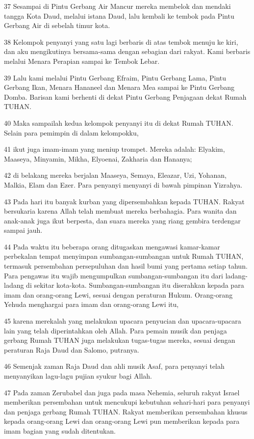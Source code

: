 \par 37 Sesampai di Pintu Gerbang Air Mancur mereka membelok dan mendaki tangga Kota Daud, melalui istana Daud, lalu kembali ke tembok pada Pintu Gerbang Air di sebelah timur kota.
\par 38 Kelompok penyanyi yang satu lagi berbaris di atas tembok menuju ke kiri, dan aku mengikutinya bersama-sama dengan sebagian dari rakyat. Kami berbaris melalui Menara Perapian sampai ke Tembok Lebar.
\par 39 Lalu kami melalui Pintu Gerbang Efraim, Pintu Gerbang Lama, Pintu Gerbang Ikan, Menara Hananeel dan Menara Mea sampai ke Pintu Gerbang Domba. Barisan kami berhenti di dekat Pintu Gerbang Penjagaan dekat Rumah TUHAN.
\par 40 Maka sampailah kedua kelompok penyanyi itu di dekat Rumah TUHAN. Selain para pemimpin di dalam kelompokku,
\par 41 ikut juga imam-imam yang meniup trompet. Mereka adalah: Elyakim, Maaseya, Minyamin, Mikha, Elyoenai, Zakharia dan Hananya;
\par 42 di belakang mereka berjalan Maaseya, Semaya, Eleazar, Uzi, Yohanan, Malkia, Elam dan Ezer. Para penyanyi menyanyi di bawah pimpinan Yizrahya.
\par 43 Pada hari itu banyak kurban yang dipersembahkan kepada TUHAN. Rakyat bersukaria karena Allah telah membuat mereka berbahagia. Para wanita dan anak-anak juga ikut berpesta, dan suara mereka yang riang gembira terdengar sampai jauh.
\par 44 Pada waktu itu beberapa orang ditugaskan mengawasi kamar-kamar perbekalan tempat menyimpan sumbangan-sumbangan untuk Rumah TUHAN, termasuk persembahan persepuluhan dan hasil bumi yang pertama setiap tahun. Para pengawas itu wajib mengumpulkan sumbangan-sumbangan itu dari ladang-ladang di sekitar kota-kota. Sumbangan-sumbangan itu diserahkan kepada para imam dan orang-orang Lewi, sesuai dengan peraturan Hukum. Orang-orang Yehuda menghargai para imam dan orang-orang Lewi itu,
\par 45 karena merekalah yang melakukan upacara penyucian dan upacara-upacara lain yang telah diperintahkan oleh Allah. Para pemain musik dan penjaga gerbang Rumah TUHAN juga melakukan tugas-tugas mereka, sesuai dengan peraturan Raja Daud dan Salomo, putranya.
\par 46 Semenjak zaman Raja Daud dan ahli musik Asaf, para penyanyi telah menyanyikan lagu-lagu pujian syukur bagi Allah.
\par 47 Pada zaman Zerubabel dan juga pada masa Nehemia, seluruh rakyat Israel memberikan persembahan untuk mencukupi kebutuhan sehari-hari para penyanyi dan penjaga gerbang Rumah TUHAN. Rakyat memberikan persembahan khusus kepada orang-orang Lewi dan orang-orang Lewi pun memberikan kepada para imam bagian yang sudah ditentukan.

